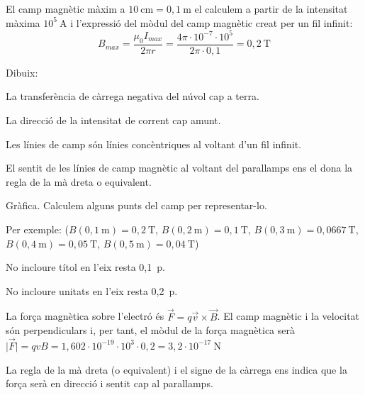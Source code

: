 \begin{solapartat}
 El camp magnètic màxim a $10\ \mathrm{cm} = 0,1\ \mathrm{m}$ el calculem a partir de la intensitat màxima $10^{5}\ \mathrm{A}$ i l'expressió del mòdul del camp magnètic creat per un fil infinit:
\[ B_{max} = \frac{\mu_0 I_{max}}{2\pi r} = \frac{4\pi\cdot 10^{-7}\cdot 10^{5}}{2\pi\cdot 0,1} = 0,2\ \mathrm{T} \]

Dibuix:


 La transferència de càrrega negativa del núvol cap a terra.

 La direcció de la intensitat de corrent cap amunt.

 Les línies de camp són línies concèntriques al voltant d'un fil infinit.

 El sentit de les línies de camp magnètic al voltant del parallamps ens el dona la regla de la mà dreta o equivalent.
\end{solapartat}

\begin{solapartat}
 Gràfica. Calculem alguns punts del camp per representar-lo.

Per exemple: ($B(0,1\ \mathrm{m}) = 0,2\ \mathrm{T}$, $B(0,2\ \mathrm{m}) = 0,1\ \mathrm{T}$, $B(0,3\ \mathrm{m}) = 0,0667\ \mathrm{T}$, $B(0,4\ \mathrm{m}) = 0,05\ \mathrm{T}$, $B(0,5\ \mathrm{m}) = 0,04\ \mathrm{T}$)


No incloure títol en l'eix resta 0,1~p.

No incloure unitats en l'eix resta 0,2~p.

 La força magnètica sobre l'electró és $\vec{F} = q\vec{v}\times\vec{B}$. El camp magnètic i la velocitat són perpendiculars i, per tant, el mòdul de la força magnètica serà $\bigl|\vec{F}\bigr| = qvB = 1,602\cdot 10^{-19}\cdot 10^{3}\cdot 0,2 = 3,2\cdot 10^{-17}\ \mathrm{N}$

 La regla de la mà dreta (o equivalent) i el signe de la càrrega ens indica que la força serà en direcció i sentit cap al parallamps.

\end{solapartat}
